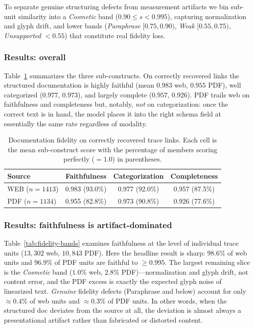 To separate genuine structuring defects from measurement artifacts we bin
sub-unit similarity into a \emph{Cosmetic} band ($0.90 \le s < 0.995$),
capturing normalization and glyph drift, and lower bands
(\emph{Paraphrase} $[0.75,0.90)$, \emph{Weak} $[0.55,0.75)$, \emph{Unsupported}
$<0.55$) that constitute real fidelity loss.

\subsubsection{Results: overall}
Table~\ref{tab:fidelity-headline} summarizes the three sub-constructs.
On correctly recovered links the structured documentation is highly faithful
(mean $0.983$ web, $0.955$ PDF), well categorized ($0.977$, $0.973$), and
largely complete ($0.957$, $0.926$). PDF trails web on faithfulness and
completeness but, notably, \emph{not} on categorization: once the correct text
is in hand, the model places it into the right schema field at essentially the
same rate regardless of modality.

\begin{table}[t]
\centering
\caption{Documentation fidelity on correctly recovered trace links. Each cell is
the mean sub-construct score with the percentage of members scoring perfectly
($=1.0$) in parentheses.}
\label{tab:fidelity-headline}
\begin{tabular}{lccc}
\toprule
Source & Faithfulness & Categorization & Completeness \\
\midrule
WEB ($n{=}1413$) & 0.983 (93.0\%) & 0.977 (92.0\%) & 0.957 (87.5\%) \\
PDF ($n{=}1134$) & 0.955 (82.8\%) & 0.973 (90.8\%) & 0.926 (77.6\%) \\
\bottomrule
\end{tabular}
\end{table}

\subsubsection{Results: faithfulness is artifact-dominated}
Table~\ref{tab:fidelity-bands} examines faithfulness at the level of individual
trace units ($13{,}302$ web, $10{,}843$ PDF). Here the headline result is
sharp: $98.6\%$ of web units and $96.9\%$ of PDF units are faithful to
$\geq 0.995$. The largest remaining slice is the \emph{Cosmetic} band
($1.0\%$ web, $2.8\%$ PDF)---normalization and glyph drift, not content error,
and the PDF excess is exactly the expected glyph noise of linearized text.
\emph{Genuine} fidelity defects (Paraphrase and below) account for only
$\approx 0.4\%$ of web units and $\approx 0.3\%$ of PDF units. In other words,
when the structured doc deviates from the source at all, the deviation is almost
always a presentational artifact rather than fabricated or distorted content.

